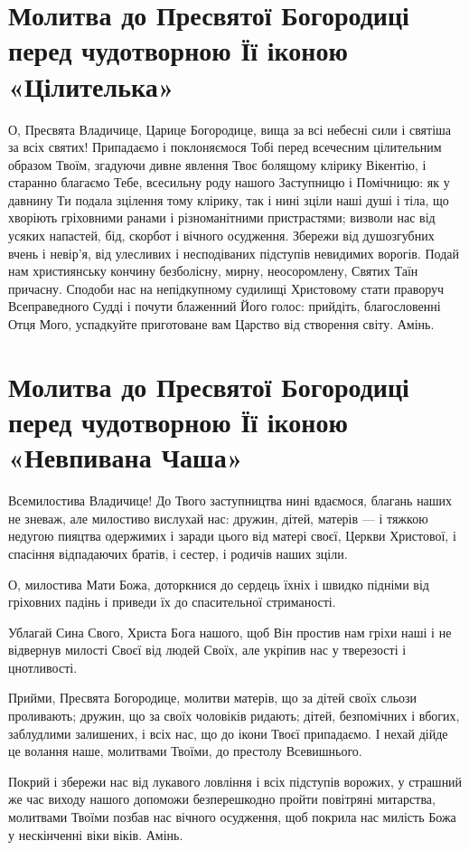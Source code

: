 \documentclass[chapters.tex]{subfiles}
\begin{document}
\section{Молитва до Пресвятої Богородиці перед чудотворною Її іконою «Цілителька»}
О, Пресвята Владичице, Царице Богородице, вища за всі небесні сили і святіша за всіх святих! Припадаємо і поклоняємося Тобі перед всечесним цілительним образом Твоїм, згадуючи дивне явлення Твоє болящому клірику Вікентію, і старанно благаємо Тебе, всесильну роду нашого Заступницю і Помічницю: як у давнину Ти подала зцілення тому клірику, так і нині зціли наші душі і тіла, що хворіють гріховними ранами і різноманітними пристрастями; визволи нас від усяких напастей, бід, скорбот і вічного осудження. Збережи від душозгубних вчень і невір’я, від улесливих і несподіваних підступів невидимих ворогів. Подай нам християнську кончину безболісну, мирну, неосоромлену, Святих Таїн причасну. Сподоби нас на непідкупному судилищі Христовому стати праворуч Всеправедного Судді і почути блаженний Його голос: прийдіть, благословенні Отця Мого, успадкуйте приготоване вам Царство від створення світу. Амінь.

\section{Молитва до Пресвятої Богородиці перед чудотворною Її іконою «Невпивана Чаша»}
Всемилостива Владичице! До Твого заступництва нині вдаємося, благань наших не зневаж, але милостиво вислухай нас: дружин, дітей, матерів — і тяжкою недугою пияцтва одержимих і заради цього від матері своєї, Церкви Христової, і спасіння відпадаючих братів, і сестер, і родичів наших зціли.

О, милостива Мати Божа, доторкнися до сердець їхніх і швидко підніми від гріховних падінь і приведи їх до спасительної стриманості.

Ублагай Сина Свого, Христа Бога нашого, щоб Він простив нам гріхи наші і не відвернув милості Своєї від людей Своїх, але укріпив нас у тверезості і цнотливості.

Прийми, Пресвята Богородице, молитви матерів, що за дітей своїх сльози проливають; дружин, що за своїх чоловіків ридають; дітей, безпомічних і вбогих, заблудлими залишених, і всіх нас, що до ікони Твоєї припадаємо. І нехай дійде це волання наше, молитвами Твоїми, до престолу Всевишнього.

Покрий і збережи нас від лукавого ловління і всіх підступів ворожих, у страшний же час виходу нашого допоможи безперешкодно пройти повітряні митарства, молитвами Твоїми позбав нас вічного осудження, щоб покрила нас милість Божа у нескінченні віки віків. Амінь.
\end{document}

